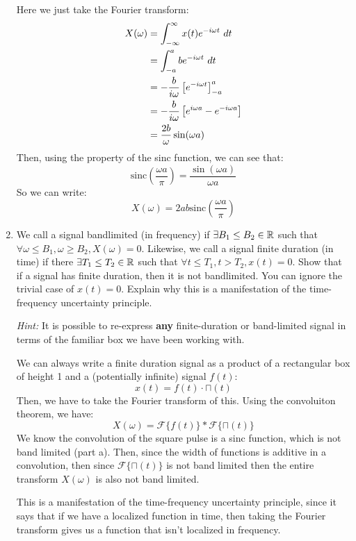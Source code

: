\documentclass[10pt]{article}
\newcommand{\sinc}{\mathrm{sinc}}
\begin{document}
\begin{enumerate}[label=\alph*)]
			\begin{solution}
				Here we just take the Fourier transform:
				\begin{align*}
					X(\omega) &=  \int_{-\infty}^{\infty} x(t) e^{-i \omega t}\ d  t  \\
					&= \int_{-a}^{a} be^{-i \omega t}\ d t  \\
					&= -\frac{b}{i \omega}\left[ e^{-i \omega t} \right]_{-a}^{a} \\
					&= -\frac{b}{i \omega}\left[ e^{i \omega a} - e^{- i \omega a} \right]  \\
					&= \frac{2b}{\omega}\sin(\omega a) 
				\end{align*}
				Then, using the property of the sinc function, we can see that: 
				\[
				\sinc\left( \frac{\omega a}{\pi} \right) = \frac{\sin(\omega a)}{\omega a}
				\] 
				So we can write:
				\[
				X(\omega) = 2ab \sinc\left( \frac{\omega a}{\pi} \right) 
				\] 
			\end{solution}
		\item We call a signal bandlimited (in frequency) if \( \exists B_1 \le B_2 \in \mathbb R \) such that 
			\( \forall \omega \le  B_1, \omega \ge B_2, X(\omega) = 0 \). Likewise, we call a signal finite duration
			(in time) if there \( \exists T_1 \le  T_2 \in \mathbb R \) such that \( \forall t \le  T_1, t >T_2, x(t) = 0 \). 
			Show that if a signal has finite duration, then it is not bandlimited. You can ignore the trivial case 
			of \( x(t) = 0 \). Explain why this is a manifestation of the time-frequency uncertainty principle. 

			\textit{Hint:} It is possible to re-express \textbf{any} finite-duration or band-limited signal 
			in terms of the familiar box we have been working with. 

			\begin{solution}
				We can always write a finite duration signal as a product of a rectangular box of height 1 
				and a (potentially infinite) signal \( f(t) \):
				\[
				x(t) = f(t) \cdot \sqcap(t)
				\] 
				Then, we have to take the Fourier transform of this. Using the convoluiton theorem, we have:
				\[
				X(\omega) = \mathcal F \{f(t)\} * \mathcal F \{\sqcap(t)\} 
				\] 
				We know the convolution of the square pulse is a sinc function, which is not band limited (part a). 
				Then, 
				since the width of functions is additive in a convolution, then since \( \mathcal F \{\sqcap(t)\}  \) 
				is not band limited then the entire transform \( X(\omega) \) is also not band limited. 

				This is a manifestation of the time-frequency uncertainty principle, since it says that if we have 
				a localized function in time, then taking the Fourier transform gives us a function that isn't localized
				in frequency. 
			\end{solution}
	\end{enumerate}
	\pagebreak
\end{document}
